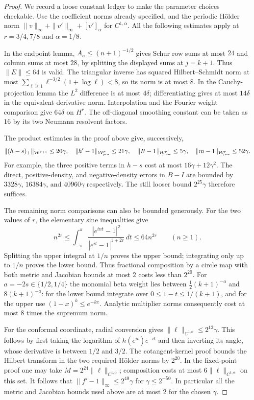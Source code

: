 \documentclass[11pt]{article}
\begin{document}
\begin{proof}
We record a loose constant ledger to make the parameter choices
checkable. Use the coefficient norms already specified, and the
periodic H\"older norm
$\|v\|_\infty+\|v'\|_\infty+[v']_\alpha$ for $C^{1,\alpha}$.
All the following estimates apply at $r=3/4,7/8$ and $\alpha=1/8$.

In the endpoint lemma, $A_n\le(n+1)^{-1/2}$ gives Schur row
sums at most $24$ and column sums at most $28$, by splitting
the displayed sums at $j=k+1$. Thus $\|E\|\le64$ is valid.
The triangular inverse has squared Hilbert--Schmidt norm at most
$\sum_{\ell\ge1}\ell^{-3/2}(1+\log\ell)<8$, so its norm is
at most $8$. In the Cauchy-projection lemma the $L^2$ difference
is at most $4\delta$; differentiating gives at most $14\delta$
in the equivalent derivative norm. Interpolation and the Fourier
weight comparison give $64\delta$ on $H^r$. The off-diagonal
smoothing constant can be taken as $16$ by its two Neumann
resolvent factors.

The product estimates in the proof above give, successively,
\[
 \|(h-s)_+\|_{\mathcal W^{r+1}}\le20\gamma,\quad
 \|h'-1\|_{\mathcal W_{\rm pos}^r}\le21\gamma,\quad
 \|R-1\|_{\mathcal W_{\rm pos}^r}\le5\gamma,\quad
 \|m-1\|_{\mathcal W_{\rm pos}^r}\le52\gamma.
\]
For example, the three positive terms in $h-s$ cost at most
$16\gamma+12\gamma^2$. The direct, positive-density, and
negative-density errors in $B-I$ are bounded by
$3328\gamma$, $16384\gamma$, and $40960\gamma$ respectively.
The still looser bound $2^{25}\gamma$ therefore suffices.

The remaining norm comparisons can also be bounded generously.
For the two values of $r$, the elementary sine inequalities give
\[
 n^{2r}\le
 \int_{-\pi}^{\pi}
  \frac{|e^{int}-1|^2}{|e^{it}-1|^{1+2r}}\,dt
 \le64n^{2r}\qquad(n\ge1).
\]
Splitting the upper integral at $1/n$ proves the upper bound;
integrating only up to $1/n$ proves the lower bound.
Thus fractional composition by a circle map with both metric
and Jacobian bounds at most $2$ costs less than $2^{20}$.
For $a=-2s\in\{1/2,1/4\}$ the monomial beta weight lies between
$\tfrac12(k+1)^{-a}$ and $8(k+1)^{-a}$: for the lower bound
integrate over $0\le1-t\le1/(k+1)$, and for the upper use
$(1-x)^k\le e^{-kx}$. Analytic multiplier norms consequently
cost at most $8$ times the supremum norm.

For the conformal coordinate, radial conversion gives
$\|\ell\|_{C^{1,\alpha}}\le2^{12}\gamma$.
This follows by first taking the logarithm of
$h(e^{it})e^{-it}$ and then inverting its angle, whose derivative
is between $1/2$ and $3/2$. The cotangent-kernel proof bounds
the Hilbert transform in the two required H\"older norms by
$2^{20}$. In the fixed-point proof one may take
$M=2^{24}\|\ell\|_{C^{1,\alpha}}$; composition costs at most
$6\|\ell\|_{C^{1,\alpha}}$ on this set. It follows that
$\|f'-1\|_\infty\le2^{40}\gamma$ for $\gamma\le2^{-50}$.
In particular all the metric and Jacobian bounds used above
are at most $2$ for the chosen $\gamma$.


\end{proof}
\end{document}
